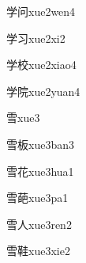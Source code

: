 \begin{verbete}[8;6]{学问}{xue2wen4}
\end{verbete}

\begin{verbete}[8;3]{学习}{xue2xi2}
\end{verbete}

\begin{verbete}[8;10]{学校}{xue2xiao4}
\end{verbete}

\begin{verbete}[8;9]{学院}{xue2yuan4}
\end{verbete}

\begin{verbete}[11]{雪}{xue3}
\end{verbete}

\begin{verbete}[11;8]{雪板}{xue3ban3}
\end{verbete}

\begin{verbete}[11;7]{雪花}{xue3hua1}
\end{verbete}

\begin{verbete}[11;12]{雪葩}{xue3pa1}
\end{verbete}

\begin{verbete}[11;2]{雪人}{xue3ren2}
\end{verbete}

\begin{verbete}[11;15]{雪鞋}{xue3xie2}
\end{verbete}

